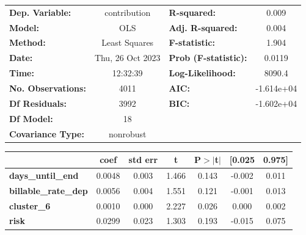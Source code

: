 \begin{center}
\begin{tabular}{lclc}
\toprule
\textbf{Dep. Variable:}                     &   contribution   & \textbf{  R-squared:         } &     0.009   \\
\textbf{Model:}                             &       OLS        & \textbf{  Adj. R-squared:    } &     0.004   \\
\textbf{Method:}                            &  Least Squares   & \textbf{  F-statistic:       } &     1.904   \\
\textbf{Date:}                              & Thu, 26 Oct 2023 & \textbf{  Prob (F-statistic):} &   0.0119    \\
\textbf{Time:}                              &     12:32:39     & \textbf{  Log-Likelihood:    } &    8090.4   \\
\textbf{No. Observations:}                  &        4011      & \textbf{  AIC:               } & -1.614e+04  \\
\textbf{Df Residuals:}                      &        3992      & \textbf{  BIC:               } & -1.602e+04  \\
\textbf{Df Model:}                          &          18      & \textbf{                     } &             \\
\textbf{Covariance Type:}                   &    nonrobust     & \textbf{                     } &             \\
\bottomrule
\end{tabular}
\begin{tabular}{lcccccc}
                                            & \textbf{coef} & \textbf{std err} & \textbf{t} & \textbf{P$> |$t$|$} & \textbf{[0.025} & \textbf{0.975]}  \\
\midrule
\textbf{days\_until\_end}                   &       0.0048  &        0.003     &     1.466  &         0.143        &       -0.002    &        0.011     \\
\textbf{billable\_rate\_dep}                &       0.0056  &        0.004     &     1.551  &         0.121        &       -0.001    &        0.013     \\
\textbf{cluster\_6}                         &       0.0010  &        0.000     &     2.227  &         0.026        &        0.000    &        0.002     \\
\textbf{risk}                               &       0.0299  &        0.023     &     1.303  &         0.193        &       -0.015    &        0.075     \\

\end{tabular}
\end{center}
